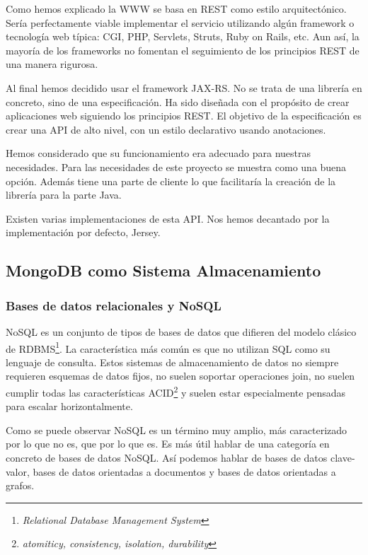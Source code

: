 Como hemos explicado la WWW se basa en REST como estilo
arquitectónico. Sería perfectamente viable implementar el servicio
utilizando algún framework o tecnología web típica: CGI, PHP,
Servlets, Struts, Ruby on Rails, etc. Aun así, la mayoría de los
frameworks no fomentan el seguimiento de los principios REST de una
manera rigurosa.

Al final hemos decidido usar el framework JAX-RS. No se trata de una
librería en concreto, sino de una especificación. Ha sido diseñada con
el propósito de crear aplicaciones web siguiendo los principios
REST. El objetivo de la especificación es crear una API de alto nivel,
con un estilo declarativo usando anotaciones.

Hemos considerado que su funcionamiento era adecuado para nuestras
necesidades. Para las necesidades de este proyecto se muestra como una
buena opción. Además tiene una parte de cliente lo que facilitaría la
creación de la librería para la parte Java.

Existen varias implementaciones de esta API. Nos hemos decantado por
la implementación por defecto, Jersey\cite{JERSEY}.

\subsection{MongoDB como Sistema Almacenamiento}
\subsubsection{Bases de datos relacionales y NoSQL}

NoSQL es un conjunto de tipos de bases de datos que difieren del
modelo clásico de RDBMS\footnote{\emph{Relational Database Management
    System}}. La característica más común es que no utilizan SQL como
su lenguaje de consulta. Estos sistemas de almacenamiento de datos no
siempre requieren esquemas de datos fijos, no suelen soportar
operaciones join, no suelen cumplir todas las características
ACID\footnote{\emph{atomiticy, consistency, isolation, durability}} y
suelen estar especialmente pensadas para escalar horizontalmente.

Como se puede observar NoSQL es un término muy amplio, más
caracterizado por lo que no es, que por lo que es. Es más útil hablar
de una categoría en concreto de bases de datos NoSQL. Así podemos
hablar de bases de datos clave-valor, bases de datos orientadas a
documentos y bases de datos orientadas a grafos.

